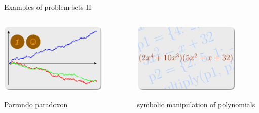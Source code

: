 \documentclass[svgnames]{beamer}
\begin{document}
\begin{frame}{Examples of problem sets II}

 \vspace{-0.7truecm}
 \begin{columns}[t]
  \begin{column}{0.5\textwidth}
   \begin{center}
    \includegraphics[width=0.8\textwidth]{parrondo}

    Parrondo paradoxon
   \end{center}
  \end{column}%
  \begin{column}{0.5\textwidth}
   \begin{center}
    \includegraphics[width=0.8\textwidth]{polynomial}

    symbolic manipulation of polynomials
   \end{center}
  \end{column}%
 \end{columns}


\end{frame}
\end{document}
